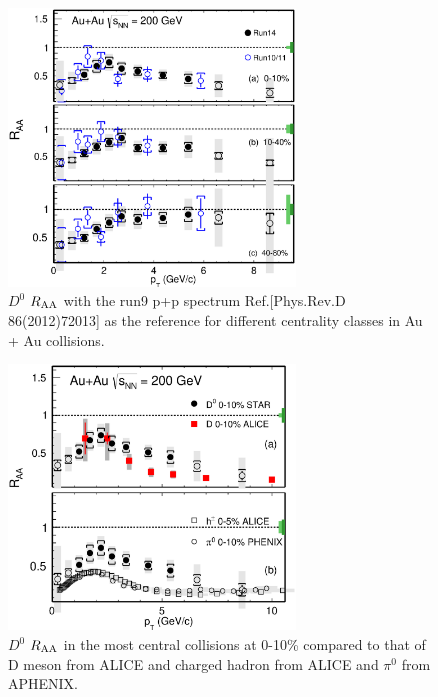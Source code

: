 \begin{figure}
\centering
\includegraphics[width=0.68\textwidth]{figure/Run14_D0HFT/D0_RAA.eps}
\caption{$D^{0}$ $R_{\rm AA}$ with the run9 p+p spectrum Ref.[Phys.Rev.D 86(2012)72013] as the reference for different centrality classes in Au + Au collisions.}
\label{D0_RAA} 
\end{figure}

\begin{figure}
\centering
\includegraphics[width=0.68\textwidth]{figure/Run14_D0HFT/D0_RAA_LHC.eps}
\caption{$D^{0}$ $R_{\rm AA}$ in the most central collisions at 0-10\% compared to that of D meson from ALICE and charged hadron from ALICE and $\pi^0$ from APHENIX.}
\label{D0_RAA_LHC} 
\end{figure}

